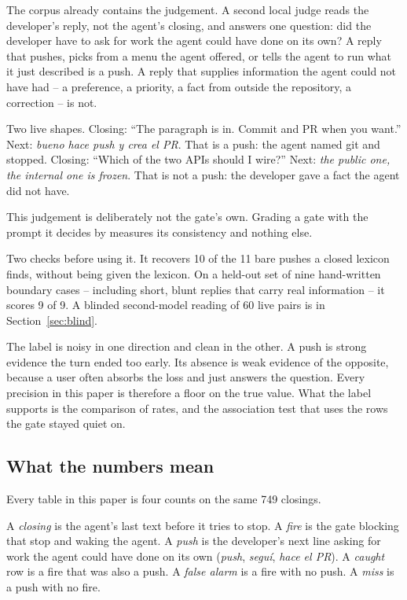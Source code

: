 The corpus already contains the judgement. A second local judge reads the
developer's reply, not the agent's closing, and answers one question: did the
developer have to ask for work the agent could have done on its own? A reply
that pushes, picks from a menu the agent offered, or tells the agent to run
what it just described is a push. A reply that supplies information the agent
could not have had -- a preference, a priority, a fact from outside the
repository, a correction -- is not.

Two live shapes. Closing: ``The paragraph is in. Commit and PR when you
want.'' Next: \emph{bueno hace push y crea el PR}. That is a push: the
agent named git and stopped. Closing: ``Which of the two APIs should
I wire?'' Next: \emph{the public one, the internal one is frozen}. That
is not a push: the developer gave a fact the agent did not have.

This judgement is deliberately not the gate's own. Grading a gate with the
prompt it decides by measures its consistency and nothing else.

Two checks before using it. It recovers 10 of the 11 bare pushes a closed
lexicon finds, without being given the lexicon. On a held-out set of nine
hand-written boundary cases -- including short, blunt replies that carry real
information -- it scores 9 of 9. A blinded second-model reading of 60 live pairs is in
Section~\ref{sec:blind}.

The label is noisy in one direction and clean in the other. A push is strong
evidence the turn ended too early. Its absence is weak evidence of the
opposite, because a user often absorbs the loss and just answers the question.
Every precision in this paper is therefore a floor on the true value. What the
label supports is the comparison of rates, and the association test that uses
the rows the gate stayed quiet on.

\subsection{What the numbers mean}
\label{sec:metrics}

Every table in this paper is four counts on the same 749 closings.

A \emph{closing} is the agent's last text before it tries to stop.
A \emph{fire} is the gate blocking that stop and waking the agent.
A \emph{push} is the developer's next line asking for work the agent
could have done on its own (\emph{push}, \emph{segu\'i}, \emph{hace el
PR}). A \emph{caught} row is a fire that was also a push. A
\emph{false alarm} is a fire with no push. A \emph{miss} is a push
with no fire.

